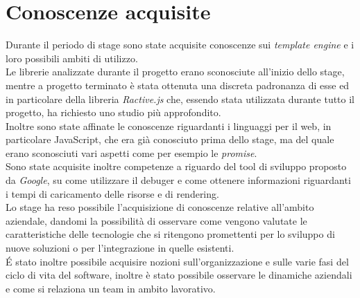 \section{Conoscenze acquisite}
Durante il periodo di stage sono state acquisite conoscenze sui \textit{template engine} e i loro possibili ambiti di utilizzo.\\
Le librerie analizzate durante il progetto erano sconosciute all'inizio dello stage, mentre a progetto terminato è stata ottenuta una discreta padronanza di esse ed in particolare della libreria \textit{Ractive.js} che, essendo stata utilizzata durante tutto il progetto, ha richiesto uno studio più approfondito.\\
Inoltre sono state affinate le conoscenze riguardanti i linguaggi per il web, in particolare JavaScript, che era già conosciuto prima dello stage, ma del quale erano sconosciuti vari aspetti come per esempio le \textit{promise}.\\
Sono state acquisite inoltre competenze a riguardo del tool di sviluppo proposto da \textit{Google}, su come utilizzare il debuger e come ottenere informazioni riguardanti i tempi di caricamento delle risorse e di rendering.\\
Lo stage ha reso possibile l'acquisizione di conoscenze relative all'ambito aziendale, dandomi la possibilità di osservare come vengono valutate le caratteristiche delle tecnologie che si ritengono promettenti per lo sviluppo di nuove soluzioni o per l'integrazione in quelle esistenti.\\
\'E stato inoltre possibile acquisire nozioni sull'organizzazione e sulle varie fasi del ciclo di vita del software, inoltre è stato possibile osservare le dinamiche aziendali e come si relaziona un team in ambito lavorativo.
